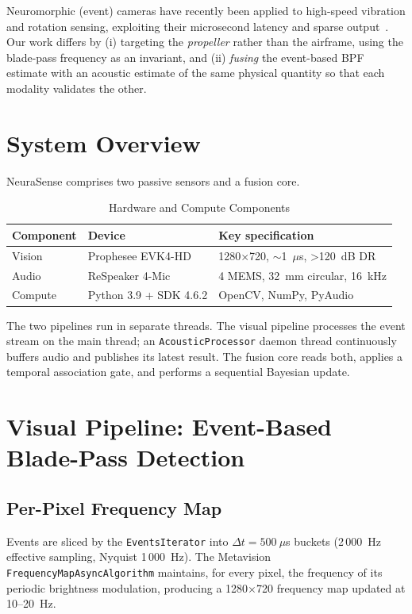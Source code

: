 \documentclass[conference]{IEEEtran}
\begin{document}
Neuromorphic (event) cameras have recently been applied to high-speed
vibration and rotation sensing, exploiting their microsecond latency and
sparse output~\cite{gallego2022}. Our work differs by (i) targeting the
\emph{propeller} rather than the airframe, using the blade-pass frequency as
an invariant, and (ii) \emph{fusing} the event-based BPF estimate with an
acoustic estimate of the same physical quantity so that each modality
validates the other.

\section{System Overview}
NeuraSense comprises two passive sensors and a fusion core.

\begin{table}[t]
\caption{Hardware and Compute Components}
\label{tab:hw}
\centering
\begin{tabular}{@{}lll@{}}
\toprule
\textbf{Component} & \textbf{Device} & \textbf{Key specification} \\
\midrule
Vision  & Prophesee EVK4-HD & 1280$\times$720, $\sim$1~$\mu$s, \textgreater120~dB DR \\
Audio   & ReSpeaker 4-Mic   & 4 MEMS, 32~mm circular, 16~kHz \\
Compute & Python 3.9 + SDK 4.6.2 & OpenCV, NumPy, PyAudio \\
\bottomrule
\end{tabular}
\end{table}

The two pipelines run in separate threads. The visual pipeline processes the
event stream on the main thread; an \texttt{AcousticProcessor} daemon thread
continuously buffers audio and publishes its latest result. The fusion core
reads both, applies a temporal association gate, and performs a sequential
Bayesian update.

\section{Visual Pipeline: Event-Based Blade-Pass Detection}
\label{sec:visual}

\subsection{Per-Pixel Frequency Map}
Events are sliced by the \texttt{EventsIterator} into $\Delta t = 500~\mu$s
buckets (2\,000~Hz effective sampling, Nyquist 1\,000~Hz). The Metavision
\texttt{FrequencyMapAsyncAlgorithm} maintains, for every pixel, the frequency
of its periodic brightness modulation, producing a 1280$\times$720 frequency
map updated at 10--20~Hz.
\end{document}

